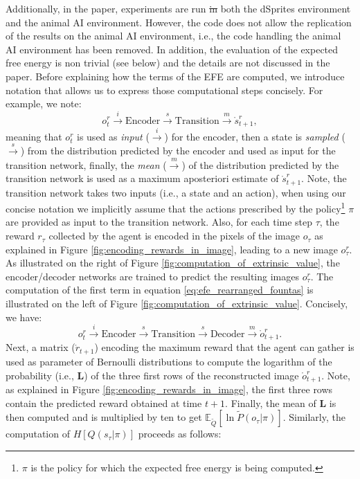 \documentclass[twoside,11pt]{article}
\providecommand{\DIFadd}[1]{{\protect\color{blue}\uwave{#1}}} %
\providecommand{\DIFdel}[1]{{\protect\color{red}\sout{#1}}}                      %
\providecommand{\DIFaddbegin}{} %
\providecommand{\DIFaddend}{} %
\providecommand{\DIFdelbegin}{} %
\providecommand{\DIFdelend}{} %
\begin{document}
Additionally, in the paper, experiments are run \DIFdelbegin \DIFdel{in }\DIFdelend \DIFaddbegin \DIFadd{on }\DIFaddend both the dSprites environment and the animal AI environment. However, the code does not allow the replication of the results on the animal AI environment, i.e., the code handling the animal AI environment has been removed. In addition, the evaluation of the expected free energy is non trivial (see below) and the details are not discussed in the paper. Before explaining how the terms of the EFE are computed, we introduce notation that allows us to express those computational steps concisely. For example, we note: 
$$o^r_t \overset{i}{\rightarrow} \text{Encoder} \overset{s}{\rightarrow} \text{Transition} \overset{m}{\rightarrow} \mathring{s}^r_{t+1},$$
meaning that $o^r_t$ is used as \textit{input} ($\overset{i}{\rightarrow}$) for the encoder, then a state is \textit{sampled} ($\overset{s}{\rightarrow}$) from the distribution predicted by the encoder and used as input for the transition network, finally, the \textit{mean} ($\overset{m}{\rightarrow}$) of the distribution predicted by the transition network is used as a maximum aposteriori estimate of $\mathring{s}^r_{t+1}$. Note, the transition network takes two inputs (i.e., a state and an action), when using our concise notation we implicitly assume that the actions prescribed by the policy\footnote{$\pi$ is the policy for which the expected free energy is being computed.} $\pi$ are provided as input to the transition network. Also, for each time step $\tau$, the reward $r_\tau$ collected by the agent is encoded in the pixels of the image $o_\tau$ as explained in Figure \ref{fig:encoding_rewards_in_image}, leading to a new image $o_\tau^r$. As illustrated on the right of Figure \ref{fig:computation_of_extrinsic_value}, the encoder/decoder networks are trained to predict the resulting images $o_\tau^r$. The computation of the first term in equation \eqref{eq:efe_rearranged_fountas} is illustrated on the left of Figure \ref{fig:computation_of_extrinsic_value}. Concisely, we have:
$$o_t^r \overset{i}{\rightarrow} \text{Encoder} \overset{s}{\rightarrow} \text{Transition} \overset{s}{\rightarrow} \text{Decoder} \overset{m}{\rightarrow} \mathring{o}_{t+1}^r.$$
Next, a matrix ($\mathring{r}_{t+1}$) encoding the maximum reward that the agent can gather is used as parameter of Bernoulli distributions to compute the logarithm of the probability (i.e., $\bm{L}$) of the three first rows of the reconstructed image $\mathring{o}_{t+1}^r$. Note, as explained in Figure \ref{fig:encoding_rewards_in_image}, the first three rows contain the predicted reward obtained at time $t+1$. Finally, the mean of $\bm{L}$ is then computed and is multiplied by ten to get $\mathbb{E}_{\tilde{Q}}[\ln \tilde{P}(o_\tau|\pi)]$. Similarly, the computation of $H[Q(s_\tau|\pi)]$ proceeds as follows:
\end{document}
